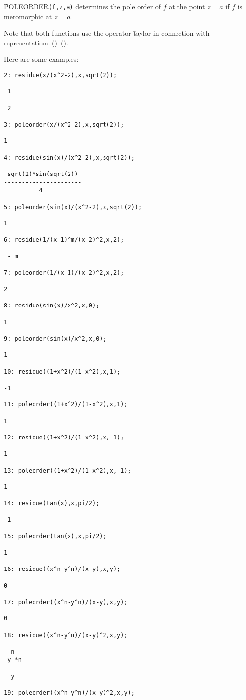 \f{POLEORDER}\texttt{(f,z,a)} determines the pole order of $f$ at the point $z=a$
if $f$ is meromorphic at $z=a$.

Note that both functions use the operator \f{taylor} in
connection with representations ()--().

Here are some examples:

\begin{verbatim}
2: residue(x/(x^2-2),x,sqrt(2));

 1
---
 2

3: poleorder(x/(x^2-2),x,sqrt(2));

1

4: residue(sin(x)/(x^2-2),x,sqrt(2));

 sqrt(2)*sin(sqrt(2))
----------------------
          4

5: poleorder(sin(x)/(x^2-2),x,sqrt(2));

1

6: residue(1/(x-1)^m/(x-2)^2,x,2);

 - m

7: poleorder(1/(x-1)/(x-2)^2,x,2);

2

8: residue(sin(x)/x^2,x,0);

1

9: poleorder(sin(x)/x^2,x,0);

1

10: residue((1+x^2)/(1-x^2),x,1);

-1

11: poleorder((1+x^2)/(1-x^2),x,1);

1

12: residue((1+x^2)/(1-x^2),x,-1);

1

13: poleorder((1+x^2)/(1-x^2),x,-1);

1

14: residue(tan(x),x,pi/2);

-1

15: poleorder(tan(x),x,pi/2);

1

16: residue((x^n-y^n)/(x-y),x,y);

0

17: poleorder((x^n-y^n)/(x-y),x,y);

0

18: residue((x^n-y^n)/(x-y)^2,x,y);

  n
 y *n
------
  y

19: poleorder((x^n-y^n)/(x-y)^2,x,y);


\end{verbatim}
